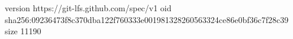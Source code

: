 version https://git-lfs.github.com/spec/v1
oid sha256:09236473f8c370dba122f760333e001981328260563324ce86e0bf36c7f28c39
size 11190
